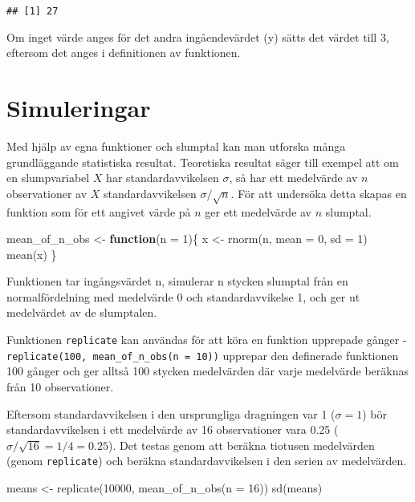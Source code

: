 \documentclass[
]{book}
\newenvironment{Shaded}{\begin{snugshade}}{\end{snugshade}}
\newcommand{\AttributeTok}[1]{\textcolor[rgb]{0.77,0.63,0.00}{#1}}
\newcommand{\ControlFlowTok}[1]{\textcolor[rgb]{0.13,0.29,0.53}{\textbf{#1}}}
\newcommand{\DecValTok}[1]{\textcolor[rgb]{0.00,0.00,0.81}{#1}}
\newcommand{\FunctionTok}[1]{\textcolor[rgb]{0.00,0.00,0.00}{#1}}
\newcommand{\NormalTok}[1]{#1}
\newcommand{\OtherTok}[1]{\textcolor[rgb]{0.56,0.35,0.01}{#1}}
\theoremstyle{definition}
\theoremstyle{definition}
\theoremstyle{definition}
\theoremstyle{definition}
\theoremstyle{remark}
\begin{document}
\begin{verbatim}
## [1] 27
\end{verbatim}

Om inget värde anges för det andra ingåendevärdet (y) sätts det värdet till 3, eftersom det anges i definitionen av funktionen.

\hypertarget{simuleringar}{%
\section{Simuleringar}\label{simuleringar}}

Med hjälp av egna funktioner och slumptal kan man utforska många grundläggande statistiska resultat. Teoretiska resultat säger till exempel att om en slumpvariabel \(X\) har standardavvikelsen \(\sigma\), så har ett medelvärde av \(n\) observationer av \(X\) standardavvikelsen \(\sigma / \sqrt n\). För att undersöka detta skapas en funktion som för ett angivet värde på \(n\) ger ett medelvärde av \(n\) slumptal.

\begin{Shaded}
\begin{Highlighting}[]
\NormalTok{mean\_of\_n\_obs }\OtherTok{\textless{}{-}} \ControlFlowTok{function}\NormalTok{(}\AttributeTok{n =} \DecValTok{1}\NormalTok{)\{}
\NormalTok{  x }\OtherTok{\textless{}{-}} \FunctionTok{rnorm}\NormalTok{(n, }\AttributeTok{mean =} \DecValTok{0}\NormalTok{, }\AttributeTok{sd =} \DecValTok{1}\NormalTok{)}
  \FunctionTok{mean}\NormalTok{(x)}
\NormalTok{\}}
\end{Highlighting}
\end{Shaded}

Funktionen tar ingångsvärdet n, simulerar n stycken slumptal från en normalfördelning med medelvärde 0 och standardavvikelse 1, och ger ut medelvärdet av de slumptalen.

Funktionen \texttt{replicate} kan användas för att köra en funktion upprepade gånger - \texttt{replicate(100,\ mean\_of\_n\_obs(n\ =\ 10))} upprepar den definerade funktionen 100 gånger och ger alltså 100 stycken medelvärden där varje medelvärde beräknas från 10 observationer.

Eftersom standardavvikelsen i den ursprungliga dragningen var 1 (\(\sigma = 1\)) bör standardavvikelsen i ett medelvärde av 16 observationer vara 0.25 (\(\sigma / \sqrt{16} = 1 / 4 = 0.25\)). Det testas genom att beräkna tiotusen medelvärden (genom \texttt{replicate}) och beräkna standardavvikelsen i den serien av medelvärden.

\begin{Shaded}
\begin{Highlighting}[]
\NormalTok{means }\OtherTok{\textless{}{-}} \FunctionTok{replicate}\NormalTok{(}\DecValTok{10000}\NormalTok{, }\FunctionTok{mean\_of\_n\_obs}\NormalTok{(}\AttributeTok{n =} \DecValTok{16}\NormalTok{))}
\FunctionTok{sd}\NormalTok{(means)}
\end{Highlighting}
\end{Shaded}
\end{document}
